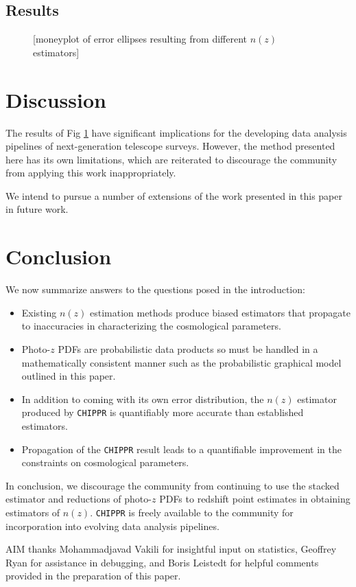 \documentclass[iop]{emulateapj}
\newcommand{\chippr}{\texttt{CHIPPR} }
\begin{document}
\subsection{Results}
\label{sec:results}

\begin{figure}
	\begin{center}
		\caption{[moneyplot of error ellipses resulting from different 
$n(z)$ estimators]}
		\label{fig:money}
	\end{center}
\end{figure}

\section{Discussion}
\label{sec:discussion}

The results of Fig \ref{fig:money} have significant implications for the 
developing data analysis pipelines of next-generation telescope surveys.  
However, the method presented here has its own limitations, which are 
reiterated to discourage the community from applying this work inappropriately.

We intend to pursue a number of extensions of the work presented in this paper 
in future work.

\section{Conclusion}
\label{sec:conclusion}

We now summarize answers to the questions posed in the introduction:

\begin{itemize}
	\item Existing $n(z)$ estimation methods produce biased estimators that 
propagate to inaccuracies in characterizing the cosmological parameters.
	\item Photo-$z$ PDFs are probabilistic data products so must be handled 
in a mathematically consistent manner such as the probabilistic graphical model 
outlined in this paper.
	\item In addition to coming with its own error distribution, the $n(z)$ 
estimator produced by \chippr is quantifiably more accurate than established 
estimators.
	\item Propagation of the \chippr result leads to a quantifiable 
improvement in the constraints on cosmological parameters.
\end{itemize}

In conclusion, we discourage the community from continuing to use the stacked 
estimator and reductions of photo-$z$ PDFs to redshift point estimates in 
obtaining estimators of $n(z)$.  \chippr is freely available to the community 
for incorporation into evolving data analysis pipelines.  



\begin{acknowledgements}
AIM thanks Mohammadjavad Vakili for insightful input on statistics, Geoffrey 
Ryan for assistance in debugging, and Boris Leistedt for helpful comments 
provided in the preparation of this paper.
\end{acknowledgements}
\end{document}

